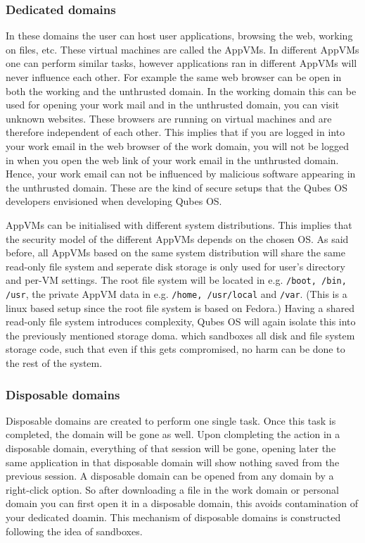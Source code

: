 \documentclass[runningheads,a4paper]{article}
\begin{document}
\subsubsection{Dedicated domains}

In these domains the user can host user applications, browsing the
web, working on files, etc. These virtual machines are called the
AppVMs. In different AppVMs one can perform similar tasks, however
applications ran in different AppVMs will never influence each other. 
For example the same web browser can be
open in both the working and the unthrusted domain. In the working
domain this can be used for opening your work mail and in the
unthrusted domain, you can visit unknown websites. These browsers are
running on virtual machines and are therefore independent of each
other. This implies that if you are logged in into your work email in
the web browser of the work domain, you will not be logged in when you
open the web link of your work email in the unthrusted domain. Hence,
your work email can not be influenced by malicious software appearing
in the unthrusted domain. These are the kind of secure setups that the Qubes
OS developers envisioned when developing Qubes OS.

AppVMs can be initialised with different system
distributions. This implies that the security model of the different AppVMs depends on the chosen OS. As said before, all AppVMs
based on the same system distribution will share the same read-only
file system and seperate disk storage is only used for user's
directory and per-VM settings. The root file system will be located in
e.g. \texttt{/boot, /bin, /usr}, the private AppVM data in
e.g. \texttt{/home, /usr/local} and \texttt{/var}. (This is a linux based setup since the root file system is based on Fedora.)
Having a shared read-only file system introduces complexity, Qubes OS will again isolate this into the previously
mentioned storage doma. which sandboxes
all disk and file system storage code, such that even if this gets
compromised, no harm can be done to the rest of the system.

\subsubsection{Disposable domains}

Disposable domains are created to perform one single task. Once this
task is completed, the domain will be gone as well. Upon clompleting
the action in a disposable domain, everything of that session will be
gone, opening later the same application in that disposable domain
will show nothing saved from the previous session. A disposable domain
can be opened from any domain by a right-click option. So after
downloading a file in the work domain or personal domain you can first
open it in a disposable domain, this avoids contamination of your
dedicated doamin. This mechanism of disposable domains is constructed
following the idea of sandboxes.
\end{document}
